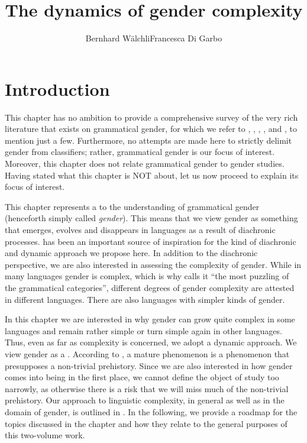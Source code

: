 \documentclass[output=collectionpaper]{langsci/langscibook}
\title{The dynamics of gender complexity}
\author{Bernhard Wälchli\lastand Francesca Di Garbo\affiliation{Stockholm University}}
\begin{document}
\maketitle

\section{Introduction}
\label{sec:WDG:1}

This chapter has no ambition to provide a comprehensive survey of the very rich literature that exists on grammatical gender, for which we refer to \citet{Corbett1991,Corbett2006,Corbett2014}, \citet{Aikhenvald2000,Aikhenvald2016}, \citet{Kilarski2013}, \citet{Heine1982}, and \citet{Seifart2010}, to mention just a few. Furthermore, no attempts are made here to strictly delimit gender from classifiers; rather, grammatical gender is our focus of interest. Moreover, this chapter does not relate grammatical gender to gender studies. Having stated what this chapter is NOT about, let us now proceed to explain its focus of interest.

This chapter represents a  to the understanding of grammatical gender (henceforth simply called \textit{gender}). This means that we view gender as something that emerges, evolves and disappears in languages as a result of diachronic processes. \cite{Greenberg1978} has been an important source of inspiration for the kind of diachronic and dynamic approach we propose here. In addition to the diachronic perspective, we are also interested in assessing the complexity of gender. While in many languages gender is complex, which is why \cite[1]{Corbett1991} calls it ``the most puzzling of the grammatical categories'', different degrees of gender complexity are attested in different languages. There are also languages with simpler kinds of gender.

In this chapter we are interested in why gender can grow quite complex in some languages and remain rather simple or turn simple again in other languages. Thus, even as far as complexity is concerned, we adopt a dynamic approach. We view gender as a . According to \cite[2]{Dahl2004}, a mature phenomenon is a phenomenon that presupposes a non-trivial prehistory. Since we are also interested in how gender comes into being in the first place, we cannot define the object of study too narrowly, as otherwise there is a risk that we will miss much of the non-trivial prehistory. Our approach to linguistic complexity, in general as well as in the domain of gender, is outlined in . In the following, we provide a roadmap for the topics discussed in the chapter and how they relate to the general purposes of this two-volume work.
\end{document}
